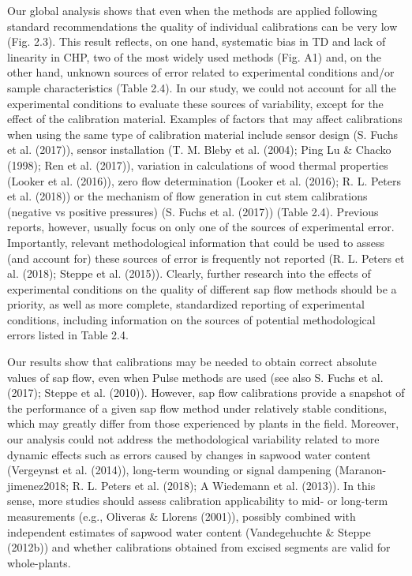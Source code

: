 \documentclass[11pt,twoside]{reedthesis}
\begin{document}
Our global analysis shows that even when the methods are applied
following standard recommendations the quality of individual
calibrations can be very low (Fig. 2.3). This result reflects, on one
hand, systematic bias in TD and lack of linearity in CHP, two of the
most widely used methods (Fig. A1) and, on the other hand, unknown
sources of error related to experimental conditions and/or sample
characteristics (Table 2.4). In our study, we could not account for all
the experimental conditions to evaluate these sources of variability,
except for the effect of the calibration material. Examples of factors
that may affect calibrations when using the same type of calibration
material include sensor design (S. Fuchs et al. (2017)), sensor
installation (T. M. Bleby et al. (2004); Ping Lu \& Chacko (1998); Ren
et al. (2017)), variation in calculations of wood thermal properties
(Looker et al. (2016)), zero flow determination (Looker et al. (2016);
R. L. Peters et al. (2018)) or the mechanism of flow generation in cut
stem calibrations (negative vs positive pressures) (S. Fuchs et al.
(2017)) (Table 2.4). Previous reports, however, usually focus on only
one of the sources of experimental error. Importantly, relevant
methodological information that could be used to assess (and account
for) these sources of error is frequently not reported (R. L. Peters et
al. (2018); Steppe et al. (2015)). Clearly, further research into the
effects of experimental conditions on the quality of different sap flow
methods should be a priority, as well as more complete, standardized
reporting of experimental conditions, including information on the
sources of potential methodological errors listed in Table 2.4.\par

Our results show that calibrations may be needed to obtain correct
absolute values of sap flow, even when Pulse methods are used (see also
S. Fuchs et al. (2017); Steppe et al. (2010)). However, sap flow
calibrations provide a snapshot of the performance of a given sap flow
method under relatively stable conditions, which may greatly differ from
those experienced by plants in the field. Moreover, our analysis could
not address the methodological variability related to more dynamic
effects such as errors caused by changes in sapwood water content
(Vergeynst et al. (2014)), long-term wounding or signal dampening
(Maranon-jimenez2018; R. L. Peters et al. (2018); A Wiedemann et al.
(2013)). In this sense, more studies should assess calibration
applicability to mid- or long-term measurements (e.g., Oliveras \&
Llorens (2001)), possibly combined with independent estimates of sapwood
water content (Vandegehuchte \& Steppe (2012b)) and whether calibrations
obtained from excised segments are valid for whole-plants.\par
\end{document}
